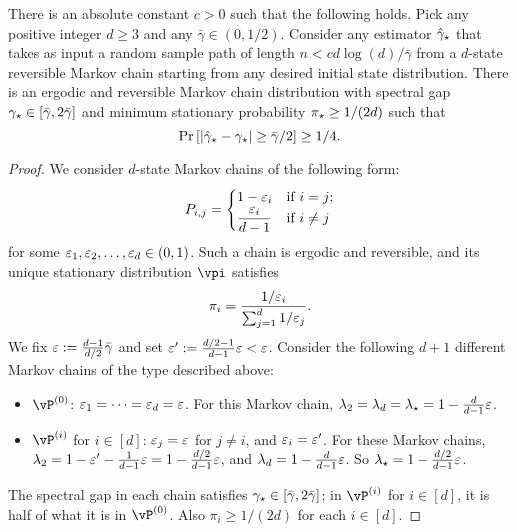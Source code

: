 \begin{theorem}
  There is an absolute constant $c>0$ such that the following holds.
  Pick any positive integer $d \geq 3$ and any $\bar\gamma \in
  (0,1/2)$.
  Consider any estimator $\hat\gamma_{\star}$ that takes as input a random sample
  path of length $n < c d\log(d) / \bar\gamma$ from a $d$-state
  reversible Markov chain starting from any desired initial state
  distribution.
  There is an ergodic and reversible Markov chain distribution
  with spectral gap $\gamma_{\star} \in [\bar\gamma,2\bar\gamma]$ and minimum
  stationary probability $\pi_{\star} \geq 1/(2d)$ such that
  \[
    \Pr\left[ |\hat\gamma_{\star} - \gamma_{\star}| \geq \bar\gamma/2\right] \geq 1/4 .
  \]
\end{theorem}
\begin{proof}
  We consider $d$-state Markov chains of the following form:
  \[
    P_{i,j} =
    \begin{cases}
      1-\varepsilon_i & \text{if $i = j$} ; \\
      \displaystyle\frac{\varepsilon_i}{d-1} & \text{if $i \neq j$}
    \end{cases}
  \]
  for some $\varepsilon_1, \varepsilon_2, \dotsc, \varepsilon_d \in (0,1)$.
  Such a chain is ergodic and reversible, and its unique stationary
  distribution $\vpi$ satisfies
  \[
    \pi_i = \frac{1/\varepsilon_i}{\sum_{j=1}^d 1/\varepsilon_j}
    .
  \]
  We fix $\varepsilon := \frac{d-1}{d/2}\bar\gamma$ and set $\varepsilon' :=
  \frac{d/2-1}{d-1} \varepsilon < \varepsilon$.
  Consider the following $d+1$ different Markov chains of the type
  described above:
  \begin{itemize}
    \item
      $\vP^{(0)}$: $\varepsilon_1 = \dotsb = \varepsilon_d = \varepsilon$.
      For this Markov chain, $\lambda_2 = \lambda_d = \lambda_{\star} =
      1-\frac{d}{d-1}\varepsilon$.

    \item
      $\vP^{(i)}$ for $i \in [d]$: $\varepsilon_j = \varepsilon$ for $j \neq i$,
      and $\varepsilon_i = \varepsilon'$.
      For these Markov chains, $\lambda_2 = 1 - \varepsilon' -
      \frac{1}{d-1}\varepsilon = 1 - \frac{d/2}{d-1} \varepsilon$,
      and $\lambda_d = 1 - \frac{d}{d-1} \varepsilon$.
      So $\lambda_{\star} = 1-\frac{d/2}{d-1} \varepsilon$.

  \end{itemize}
  The spectral gap in each chain satisfies $\gamma_{\star} \in
  [\bar\gamma,2\bar\gamma]$; in $\vP^{(i)}$ for $i \in [d]$, it is half
  of what it is in $\vP^{(0)}$.
  Also $\pi_i \geq 1/(2d)$ for each $i \in [d]$.


\end{proof}
